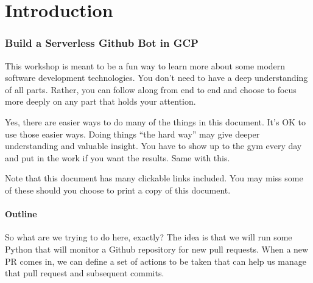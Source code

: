 






\tableofcontents
\clearpage
\listoffigures
\listoftables
\clearpage
\part{Introduction}

\section{\label{sec:Start}Build a Serverless Github Bot in GCP}
\vspace{2mm}

\justifying
This workshop is meant to be a fun way to learn more about some modern software development technologies.
You don't need to have a deep understanding of all parts. Rather, you can follow along from end to end
and choose to focus more deeply on any part that holds your attention.
\vspace{2mm}

\justifying
Yes, there are easier ways to do many of the things in this document. It's OK to use those easier ways.
Doing things ``the hard way'' may give deeper understanding and valuable insight. You have to show
up to the gym every day and put in the work if you want the results. Same with this.
\vspace{2mm}

\justifying
Note that this document has many clickable links included. You may miss some of these should you choose 
to print a copy of this document.
\vspace{2mm}


\subsection{\label{sec:outline}Outline}

\justifying
So what are we trying to do here, exactly? The idea is that we will run some Python that will monitor
a Github repository for new pull requests. When a new PR comes in, we can define a set of actions to
be taken that can help us manage that pull request and subsequent commits.
\vspace{2mm}

